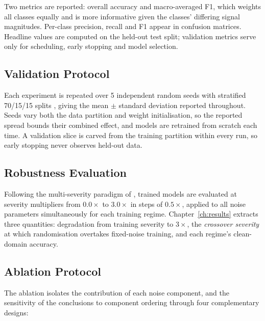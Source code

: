 Two metrics are reported: overall accuracy and macro-averaged F1, which weights all classes equally and is more informative given the classes' differing signal magnitudes. Per-class precision, recall and F1 appear in confusion matrices. Headline values are computed on the held-out test split; validation metrics serve only for scheduling, early stopping and model selection.

\subsection{Validation Protocol}
\label{sec:method-stats}

Each experiment is repeated over 5 independent random seeds with stratified 70/15/15 splits \parencite{kohavi1995crossval}, giving the mean $\pm$ standard deviation reported throughout. Seeds vary both the data partition and weight initialisation, so the reported spread bounds their combined effect, and models are retrained from scratch each time. A validation slice is carved from the training partition within every run, so early stopping never observes held-out data.

\subsection{Robustness Evaluation}
\label{sec:method-robustness}


Following the multi-severity paradigm of \textcite{hendrycks2019}, trained models are evaluated at severity multipliers from $0.0\times$ to $3.0\times$ in steps of $0.5\times$, applied to all noise parameters simultaneously for each training regime. Chapter~\ref{ch:results} extracts three quantities: degradation from training severity to $3\times$, the \emph{crossover severity} at which randomisation overtakes fixed-noise training, and each regime's clean-domain accuracy.


\subsection{Ablation Protocol}
\label{sec:method-ablation}

The ablation isolates the contribution of each noise component, and the sensitivity of the conclusions to component ordering through four complementary designs:

